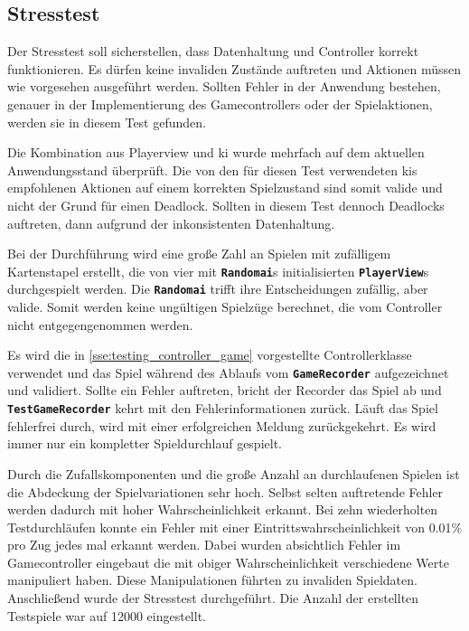 \documentclass[
							a4paper, 
							11pt, 
							openany, 
							liststotoc,
							parskip=half, 
   							headings=normal
						]{scrreprt}
\begin{document}
{\clearpage

\subsection{Stresstest} \label{sse:testing_tests_stress}
Der Stresstest soll sicherstellen, dass Datenhaltung und Controller korrekt funktionieren. Es dürfen keine invaliden Zustände auftreten und Aktionen müssen wie vorgesehen ausgeführt werden. Sollten Fehler in der Anwendung bestehen, genauer in der Implementierung des Gamecontrollers oder der Spielaktionen, werden sie in diesem Test gefunden.

Die Kombination aus Playerview und \acs{ki} wurde mehrfach auf dem aktuellen Anwendungsstand überprüft. Die von den für diesen Test verwendeten \acs{ki}s empfohlenen Aktionen auf einem korrekten Spielzustand sind somit valide und nicht der Grund für einen Deadlock. Sollten in diesem Test dennoch Deadlocks auftreten, dann aufgrund der inkonsistenten Datenhaltung.

Bei der Durchführung wird eine große Zahl an Spielen mit zufälligem Kartenstapel erstellt, die von vier mit \textbf{\texttt{Random\acs{ai}}}s initialisierten \textbf{\texttt{PlayerView}}s durchgespielt werden. Die \textbf{\texttt{Random\acs{ai}}} trifft ihre Entscheidungen zufällig, aber valide. Somit werden keine ungültigen Spielzüge berechnet, die vom Controller nicht entgegengenommen werden.

Es wird die in \autoref{sse:testing_controller_game} vorgestellte Controllerklasse verwendet und das Spiel während des Ablaufs vom \textbf{\texttt{GameRecorder}} aufgezeichnet und validiert. Sollte ein Fehler auftreten, bricht der Recorder das Spiel ab und \textbf{\texttt{TestGameRecorder}} kehrt mit den Fehlerinformationen zurück. Läuft das Spiel fehlerfrei durch, wird mit einer erfolgreichen Meldung zurückgekehrt. Es wird immer nur ein kompletter Spieldurchlauf gespielt.

Durch die Zufallskomponenten und die große Anzahl an durchlaufenen Spielen ist die Abdeckung der Spielvariationen sehr hoch. Selbst selten auftretende Fehler werden dadurch mit hoher Wahrscheinlichkeit erkannt. Bei zehn wiederholten Testdurchläufen konnte ein Fehler mit einer Eintrittswahrscheinlichkeit von 0.01\% pro Zug jedes mal erkannt werden. Dabei wurden absichtlich Fehler im Gamecontroller eingebaut die mit obiger Wahrscheinlichkeit verschiedene Werte manipuliert haben. Diese Manipulationen führten zu invaliden Spieldaten. Anschließend wurde der Stresstest durchgeführt. Die Anzahl der erstellten Testspiele war auf 12000 eingestellt.

}
\end{document}
